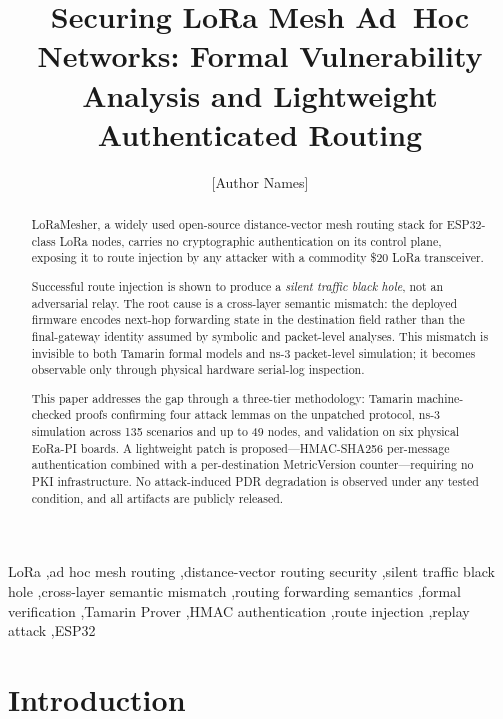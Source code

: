 \documentclass[preprint,12pt]{elsarticle}
\begin{document}
\begin{frontmatter}

\title{Securing LoRa Mesh Ad~Hoc Networks: Formal Vulnerability
       Analysis and Lightweight Authenticated Routing}

\author[inst1]{[Author Names]}
\address[inst1]{[Institution, Country]}
\ead{[email]}

\begin{abstract}
LoRaMesher, a widely used open-source distance-vector mesh routing
stack for ESP32-class LoRa nodes, carries no cryptographic
authentication on its control plane, exposing it to route injection
by any attacker with a commodity \$20 LoRa transceiver.

Successful route injection is shown to produce a \emph{silent
traffic black hole}, not an adversarial relay.
The root cause is a cross-layer semantic mismatch: the deployed
firmware encodes next-hop forwarding state in the destination
field rather than the final-gateway identity assumed by symbolic
and packet-level analyses.
This mismatch is invisible to both Tamarin formal models and ns-3
packet-level simulation; it becomes observable only through
physical hardware serial-log inspection.

This paper addresses the gap through a three-tier methodology:
Tamarin machine-checked proofs confirming four attack lemmas on
the unpatched protocol, ns-3 simulation across 135 scenarios and
up to 49 nodes, and validation on six physical EoRa-PI boards.
A lightweight patch is proposed—HMAC-SHA256 per-message
authentication combined with a per-destination MetricVersion
counter—requiring no PKI infrastructure.
No attack-induced PDR degradation is observed under any tested
condition, and all artifacts are publicly released.
\end{abstract}

\begin{keyword}
LoRa \sep ad hoc mesh routing \sep distance-vector routing security
\sep silent traffic black hole \sep cross-layer semantic mismatch
\sep routing forwarding semantics \sep formal verification
\sep Tamarin Prover \sep HMAC authentication
\sep route injection \sep replay attack \sep ESP32
\end{keyword}

\end{frontmatter}

\section{Introduction}
\label{sec:intro}
\end{document}
